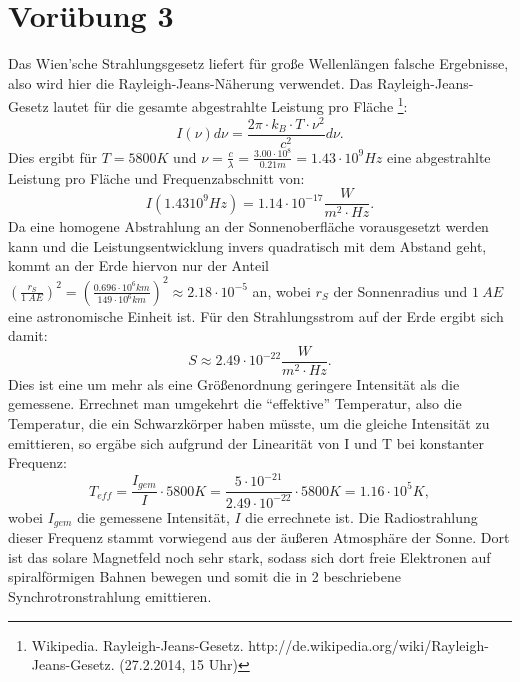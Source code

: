 \documentclass[titlepage]{scrartcl}
\begin{document}
\section{Vorübung 3}
Das Wien'sche Strahlungsgesetz liefert für große Wellenlängen falsche Ergebnisse, also wird hier die Rayleigh-Jeans-Näherung verwendet.
Das Rayleigh-Jeans-Gesetz lautet für die gesamte abgestrahlte Leistung pro Fläche \footnote{Wikipedia. Rayleigh-Jeans-Gesetz. http://de.wikipedia.org/wiki/Rayleigh-Jeans-Gesetz. (27.2.2014, 15 Uhr)}: 
\begin{equation}
I(\nu) d\nu = \frac{2\pi \cdot k_B \cdot T \cdot \nu^2}{c^2} d\nu. 
\end{equation}
Dies ergibt für $ T = 5800 K$ und $\nu = \frac{c}{\lambda} = \frac{3.00\cdot 10^8}{0.21 m} = 1.43 \cdot 10^9 Hz$ eine abgestrahlte Leistung pro Fläche und Frequenzabschnitt von: 
\begin{equation}
I(1.43 10^{9} Hz) = 1.14 \cdot 10^{-17} \frac{W}{m^2 \cdot Hz}.
\end{equation}
Da eine homogene Abstrahlung an der Sonnenoberfläche vorausgesetzt werden kann und die Leistungsentwicklung invers quadratisch mit dem Abstand geht, kommt an der Erde hiervon nur der Anteil $ (\frac{r_S}{1\ AE})^2 = (\frac{0.696 \cdot 10^{6} km}{149 \cdot 10^6 km})^2 \approx 2.18 \cdot 10^{-5} $ an, wobei $r_S$ der Sonnenradius und $ 1\ AE$ eine astronomische Einheit ist. 
Für den Strahlungsstrom auf der Erde ergibt sich damit: 
\begin{equation}
S \approx 2.49 \cdot 10^{-22} \frac{W}{m^2 \cdot  Hz}.
\end{equation}
Dies ist eine um mehr als eine Größenordnung geringere Intensität als die gemessene. 
Errechnet man umgekehrt die \enquote{effektive} Temperatur, also die Temperatur, die ein Schwarzkörper haben müsste, um die gleiche Intensität zu emittieren, so ergäbe sich aufgrund der Linearität von I und T bei konstanter Frequenz: 
\begin{equation}
T_{eff} = \frac{I_{gem}}{I} \cdot 5800 K = \frac{5 \cdot 10^{-21}}{2.49 \cdot 10^{-22}} \cdot 5800 K = 1.16 \cdot 10^5 K,
\end{equation}
wobei $I_{gem}$ die gemessene Intensität, $I$ die errechnete ist. 
Die Radiostrahlung dieser Frequenz stammt vorwiegend aus der äußeren Atmosphäre der Sonne. Dort ist das solare Magnetfeld noch sehr stark, sodass sich dort freie Elektronen auf spiralförmigen Bahnen bewegen und somit die in 2 beschriebene Synchrotronstrahlung emittieren. 
\end{document}
